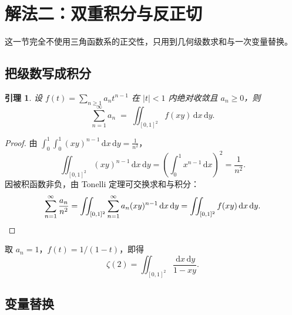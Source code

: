 \documentclass[11pt,a4paper]{ctexart}
\newtheorem{lemma}[theorem]{引理}
\theoremstyle{definition}
\theoremstyle{remark}
\newcommand{\dd}{\,\mathrm{d}}
\begin{document}
\section{解法二：双重积分与反正切}

这一节完全不使用三角函数系的正交性，只用到几何级数求和与一次变量替换。

\subsection{把级数写成积分}

\begin{lemma}
\label{lem:double-int}
设 $f(t)=\sum_{n\ge 1} a_n t^{n-1}$ 在 $|t|<1$ 内绝对收敛且 $a_n\ge 0$，则
\begin{equation}
  \sum_{n=1}^{\infty} a_{n}
  \;=\; \iint_{[0,1]^{2}} f(xy)\dd x\dd y .
\end{equation}
\end{lemma}

\begin{proof}
由 $\int_0^1\int_0^1 (xy)^{n-1}\dd x\dd y=\frac{1}{n^{2}}$，
\begin{equation}
  \iint_{[0,1]^{2}}(xy)^{n-1}\dd x\dd y
  =\left(\int_0^1 x^{n-1}\dd x\right)^{2}
  =\frac{1}{n^{2}} .
\end{equation}
因被积函数非负，由 Tonelli 定理可交换求和与积分：
\begin{equation}
  \sum_{n=1}^{\infty}\frac{a_n}{n^{2}}
  =\iint_{[0,1]^{2}}\sum_{n=1}^{\infty}a_n (xy)^{n-1}\dd x\dd y
  =\iint_{[0,1]^{2}} f(xy)\dd x\dd y .
  \qedhere
\end{equation}
\end{proof}

取 $a_n=1$，$f(t)=1/(1-t)$，即得
\begin{equation}
  \zeta(2)=\iint_{[0,1]^{2}}\frac{\dd x\dd y}{1-xy}.
  \label{eq:zeta-int}
\end{equation}

\subsection{变量替换}
\end{document}
